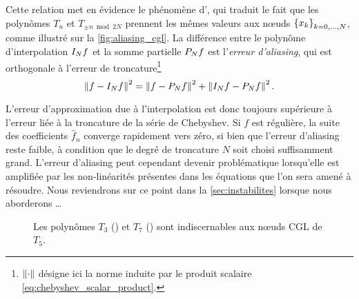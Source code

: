 Cette relation met en évidence le phénomène d', qui traduit le fait que les polynômes $T_n$ et $T_{\pm n \bmod{2N}}$ prennent les mêmes valeurs aux n\oe uds $\family{x}{k}{0}{N}$, comme illustré sur la \autoref{fig:aliasing_cgl}.
La différence entre le polynôme d'interpolation $\interpolant{f}{N}$ et la somme partielle $\truncseries{f}{N}$ est l'\textit{erreur d'aliasing}, qui est orthogonale à l'erreur de troncature\footnote{$\normtwo{\cdot}$ désigne ici la norme induite par le produit scalaire \eqref{eq:chebyshev_scalar_product}.}
\begin{equation}
	\normtwo{f - \interpolant{f}{N}}^2 = 
	\normtwo{f - \truncseries{f}{N}}^2 + 
	\normtwo{\interpolant{f}{N} - \truncseries{f}{N}}^2.
	\label{eq:chebyshev_aliasin_esrror}
\end{equation}

L'erreur d'approximation due à l'interpolation est donc toujours supérieure à l'erreur liée à la troncature de la série de Chebyshev.
Si $f$ est régulière, la suite des coefficients $\hat{f}_n$ converge rapidement vers zéro, si bien que l'erreur d'aliasing reste faible, à condition que le degré de troncature $N$ soit choisi suffisamment grand.
L'erreur d'aliasing peut cependant devenir problématique lorsqu'elle est amplifiée par les non-linéarités présentes dans les équations que l'on sera amené à résoudre. 
Nous reviendrons sur ce point dans la \autoref{sec:instabilites} lorsque nous aborderons \ldots


\begin{figure}
	\centering
	\caption{Les polynômes $T_3$ (\protect{}) et $T_7$ (\protect{}) sont indiscernables aux n\oe uds CGL de $T_5$.}
	\label{fig:aliasing_cgl}
\end{figure}


